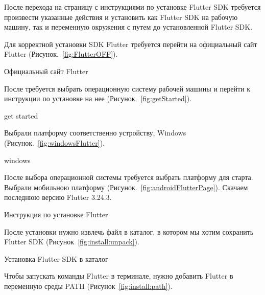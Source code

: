 После перехода на страницу с инструкциями по установке Flutter SDK требуется произвести
указанные действия и установить как Flutter SDK на рабочую машину, так и переменную окружения
с путем до установленной Flutter SDK.

Для корректной установки SDK Flutter требуется перейти
на официальный сайт Flutter (Рисунок.~\ref{fig:FlutterOFF}).

\begin{image}
	\caption{Официальный сайт Flutter}
	\label{fig:FlutterOFF}
\end{image}


\clearpage

После требуется выбрать операционную систему рабочей машины
и перейти к инструкции по установке на нее (Рисунок.~\ref{fig:getStarted}).

\begin{image}
	\caption{get started}
	\label{fig:getStarted}
\end{image}


Выбрали платформу соответственно устройству, Windows (Рисунок.~\ref{fig:windowsFlutter}).

\begin{image}
	\caption{windows}
	\label{fig:windowsFlutter}
\end{image}

\clearpage

После выбора операционной системы требуется выбрать платформу для старта.
Выбрали мобильною платформу (Рисунок.~\ref{fig:androidFlutterPage}).
Скачаем последнюю версию Flutter 3.24.3.

\begin{image}
	\caption{Инструкция по установке Flutter}
	\label{fig:androidFlutterPage}
\end{image}


После установки нужно извлечь файл в каталог,
в котором мы хотим сохранить Flutter SDK (Рисунок~\ref{fig:install:unpack}).

\begin{image}
	\caption{Установка Flutter SDK в каталог}
	\label{fig:install:unpack}
\end{image}

\clearpage

Чтобы запускать команды Flutter в терминале,
нужно добавить Flutter в переменную среды PATH
(Рисунок~\ref{fig:install:path}).

